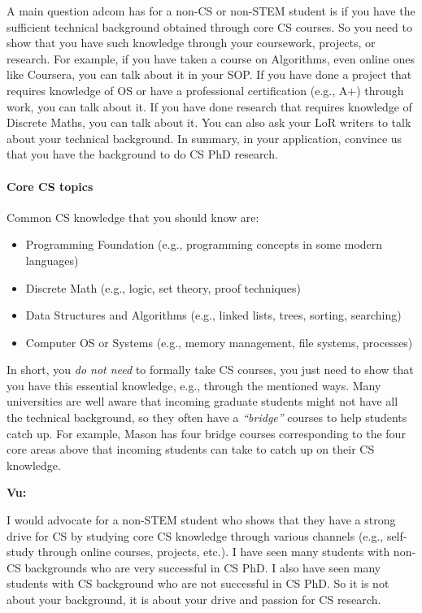 \documentclass[oneside,11pt,dvipsnames]{book}
\newenvironment{commentbox}[1][]{
  \small
  \begin{mybox}
    {\small \textbf{#1}}
  }{
  \end{mybox}
}
\begin{document}
A main question adcom has for a non-CS or non-STEM student is if you have the sufficient technical background obtained through core CS courses.  So you need to show that you have such knowledge through your coursework, projects, or research.
For example, if you have taken a course on Algorithms, even online ones like Coursera, you can talk about it in your SOP.  If you have done a project that requires knowledge of OS or have a professional certification (e.g., A+) through work, you can talk about it.  If you have done research that requires knowledge of Discrete Maths, you can talk about it.  You can also ask your LoR writers to talk about your technical background.
In summary, in your application, convince us that you have the background to do CS PhD research.


\paragraph{Core CS topics} Common CS knowledge that you should know are:
\begin{itemize}
  \item Programming Foundation (e.g., programming concepts in some modern languages)
  \item Discrete Math (e.g., logic, set theory, proof techniques)
  \item Data Structures and Algorithms (e.g., linked lists, trees, sorting, searching)
  \item Computer OS or Systems (e.g., memory management, file systems, processes)
\end{itemize}

In short, you \emph{do not need} to formally take CS courses, you just need to show that you have this essential knowledge, e.g., through the mentioned ways. Many universities are well aware that incoming graduate students might not have all the technical background, so they often have a \emph{``bridge''} courses to help students catch up.  For example, Mason has four bridge courses corresponding to the four core areas above that incoming students can take to catch up on their CS knowledge.


\begin{commentbox}[Vu:]
  I would advocate for a non-STEM student who shows that they have a strong drive for CS by studying core CS knowledge through various channels (e.g., self-study through online courses, projects, etc.).  I have seen many students with non-CS backgrounds who are very successful in CS PhD.  I also have seen many students with CS background who are not successful in CS PhD.  So it is not about your background, it is about your drive and passion for CS research.
\end{commentbox}
\end{document}
